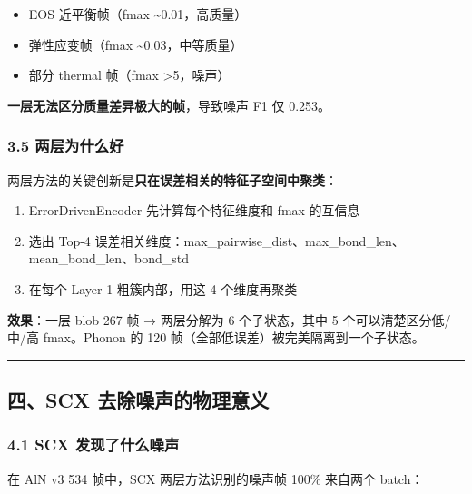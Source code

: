 \documentclass[
  12pt,
]{ctexart}
\providecommand{\tightlist}{%
  \setlength{\itemsep}{0pt}\setlength{\parskip}{0pt}}
\begin{document}
\begin{itemize}
\tightlist
\item
  EOS 近平衡帧（fmax \textasciitilde0.01，高质量）
\item
  弹性应变帧（fmax \textasciitilde0.03，中等质量）
\item
  部分 thermal 帧（fmax \textgreater5，噪声）
\end{itemize}

\textbf{一层无法区分质量差异极大的帧}，导致噪声 F1 仅 0.253。

\subsubsection{3.5
两层为什么好}\label{ux4e24ux5c42ux4e3aux4ec0ux4e48ux597d}

两层方法的关键创新是\textbf{只在误差相关的特征子空间中聚类}：

\begin{enumerate}
\def\labelenumi{\arabic{enumi}.}
\tightlist
\item
  ErrorDrivenEncoder 先计算每个特征维度和 fmax 的互信息
\item
  选出 Top-4
  误差相关维度：max\_pairwise\_dist、max\_bond\_len、mean\_bond\_len、bond\_std
\item
  在每个 Layer 1 粗簇内部，用这 4 个维度再聚类
\end{enumerate}

\textbf{效果}：一层 blob 267 帧 → 两层分解为 6 个子状态，其中 5
个可以清楚区分低/中/高 fmax。Phonon 的 120
帧（全部低误差）被完美隔离到一个子状态。

\begin{center}\rule{0.5\linewidth}{0.5pt}\end{center}

\subsection{四、SCX
去除噪声的物理意义}\label{ux56dbscx-ux53bbux9664ux566aux58f0ux7684ux7269ux7406ux610fux4e49}

\subsubsection{4.1 SCX
发现了什么噪声}\label{scx-ux53d1ux73b0ux4e86ux4ec0ux4e48ux566aux58f0}

在 AlN v3 534 帧中，SCX 两层方法识别的噪声帧 100\% 来自两个 batch：
\end{document}
